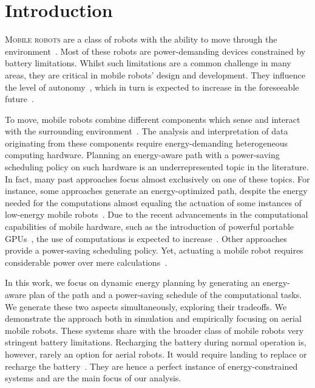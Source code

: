 
\chapter{Introduction}
\label{cp:intro}


\lettrine{M}{obile robots} are a class of robots with the ability to move through the environment~\citep{corke2017robotics}. Most of these robots are power-demanding devices constrained by battery limitations. Whilst such limitations are a common challenge in many areas, they are critical in mobile robots' design and development. They influence the level of autonomy~\citep{seewald2020mechanical}, which in turn is expected to increase in the foreseeable future~\citep{fisher2013verifying}.

To move, mobile robots combine different components which sense and interact with the surrounding environment~\citep{mei2006deployment}. The analysis and interpretation of data originating from these components require energy-demanding heterogeneous computing hardware. Planning an energy-aware path with a power-saving scheduling policy on such hardware is an underrepresented topic in the literature. In fact, many past approaches focus almost exclusively on one of these topics. For instance, some approaches generate an energy-optimized path, despite the energy needed for the computations almost equaling the actuation of some instances of low-energy mobile robots~\citep{sudhakar2020balancing}. Due to the recent advancements in the computational capabilities of mobile hardware, such as the introduction of powerful portable GPUs~\citep{rizvi2017general}, the use of computations is expected to increase~\citep{abramov2012real,satria2016real,jaramillo2019visual}. Other approaches provide a power-saving scheduling policy. Yet, actuating a mobile robot requires considerable power over mere calculations~\citep{mei2004energy,mei2005case}.

In this work, we focus on dynamic energy planning by generating an energy-aware plan of the path and a power-saving schedule of the computational tasks. We generate these two aspects simultaneously, exploring their tradeoffs. We demonstrate the approach both in simulation and empirically focusing on aerial mobile robots. These systems share with the broader class of mobile robots very stringent battery limitations. Recharging the battery during normal operation is, however, rarely an option for aerial robots. It would require landing to replace or recharge the battery~\citep{zamanakos2020energy}. They are hence a perfect instance of energy-constrained systems and are the main focus of our analysis.

